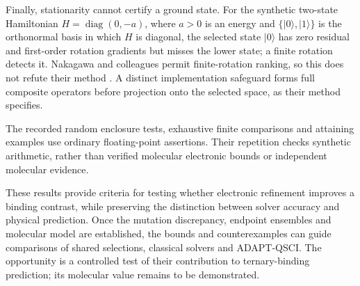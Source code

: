 \documentclass{article}
\begin{document}
Finally, stationarity cannot certify a ground state. For the synthetic two-state Hamiltonian \(H=\operatorname{diag}(0,-a)\), where \(a>0\) is an energy and \(\{|0\rangle,|1\rangle\}\) is the orthonormal basis in which \(H\) is diagonal, the selected state \(|0\rangle\) has zero residual and first-order rotation gradients but misses the lower state; a finite rotation detects it. Nakagawa and colleagues permit finite-rotation ranking, so this does not refute their method \cite{P}. A distinct implementation safeguard forms full composite operators before projection onto the selected space, as their method specifies.

The recorded random enclosure tests, exhaustive finite comparisons and attaining examples use ordinary floating-point assertions. Their repetition checks synthetic arithmetic, rather than verified molecular electronic bounds or independent molecular evidence.

These results provide criteria for testing whether electronic refinement improves a binding contrast, while preserving the distinction between solver accuracy and physical prediction. Once the mutation discrepancy, endpoint ensembles and molecular model are established, the bounds and counterexamples can guide comparisons of shared selections, classical solvers and ADAPT-QSCI. The opportunity is a controlled test of their contribution to ternary-binding prediction; its molecular value remains to be demonstrated.

\clearpage


\end{document}

